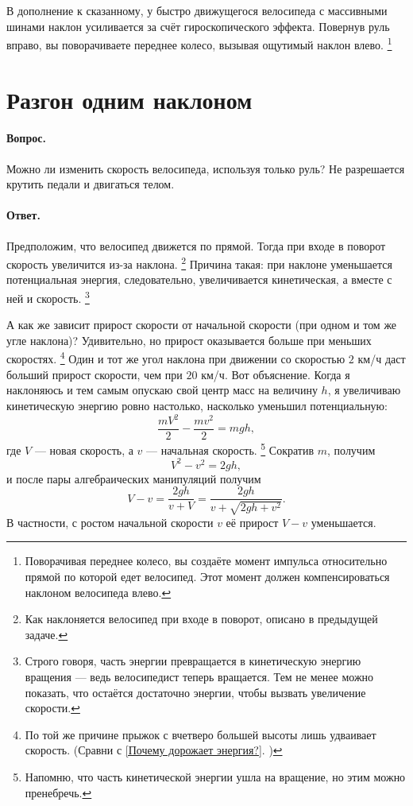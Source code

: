 В дополнение к сказанному, у быстро движущегося велосипеда с массивными шинами
наклон усиливается за счёт гироскопического эффекта.
Повернув руль вправо, вы поворачиваете переднее колесо, вызывая ощутимый наклон влево.%
\footnote{Поворачивая переднее колесо, вы создаёте момент импульса относительно прямой по которой едет велосипед.
Этот момент должен компенсироваться наклоном велосипеда влево. \pr}

\section{Разгон одним наклоном}\label{Разгон одним наклоном}

\paragraph{Вопрос.}
Можно ли изменить скорость велосипеда, используя только руль?
Не разрешается крутить педали и двигаться телом.

\paragraph{Ответ.}
Предположим, что велосипед движется по прямой.
Тогда при входе в поворот скорость увеличится из-за наклона.%
\footnote{Как наклоняется велосипед при входе в поворот, описано в предыдущей задаче.}
Причина такая: при наклоне уменьшается потенциальная энергия,
следовательно, увеличивается кинетическая, а вместе с ней и скорость.%
\footnote{Строго говоря, часть энергии превращается в кинетическую энергию вращения --- ведь велосипедист теперь вращается.
Тем не менее можно показать, что остаётся достаточно энергии, чтобы вызвать увеличение скорости.}

А как же зависит прирост скорости от начальной скорости (при одном и том же угле наклона)?
Удивительно, но прирост оказывается больше при меньших скоростях.%
\footnote{По той же причине прыжок с вчетверо большей высоты лишь удваивает скорость. (Сравни с \ref{Почему дорожает энергия?}. \pr)}
Один и тот же угол наклона при движении со скоростью $2$ км/ч даст больший прирост скорости, чем при $20$ км/ч.
Вот объяснение.
Когда я наклоняюсь и тем самым опускаю свой центр масс на
величину $h$, я увеличиваю кинетическую энергию ровно настолько, насколько уменьшил потенциальную:
\[
\frac{mV^2}2-\frac{mv^2}2=mgh,
\]
где $V$ --- новая скорость, а $v$ --- начальная скорость.%
\footnote{Напомню, что часть кинетической энергии ушла на вращение, но этим можно пренебречь.}
Сократив $m$, получим
\[
V^2-v^2=2gh,\]
и после пары алгебраических манипуляций получим
\[V-v=\frac{2gh}{v+V}=\frac{2gh}{v+\sqrt{2gh+v^2}}.\]
В частности,
с ростом начальной скорости $v$
её прирост $V-v$ уменьшается.


